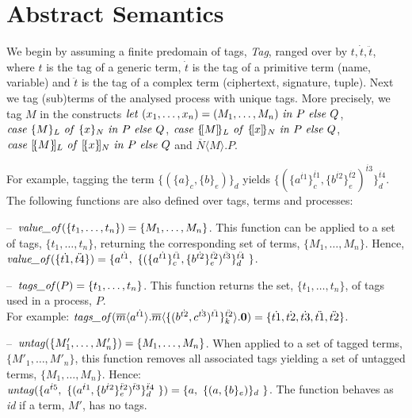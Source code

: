 \documentclass{entcs} \usepackage{entcsmacro}
\begin{document}
\section{Abstract Semantics\label{sect:abssemspi}}
We begin by assuming a finite predomain of tags, {\itshape Tag\/}, ranged over by $t, \dot{t}, \ddot{t}$, where $t$ is the tag of a generic term, $\dot{t}$ is the tag of a primitive term (name, variable) and $\ddot{t}$ is the tag of a complex term (ciphertext, signature, tuple).  Next we tag (sub)terms of the analysed process with unique tags.  More precisely, we tag $M$ in the constructs $\mbox{{\itshape let\/} }(x_1,\ldots,x_n)=(M_1,\ldots,M_n)\mbox{ {\itshape in\/} }P\mbox{ {\itshape else\/} }Q$, $\mbox{{\itshape case\/} }\{M\}_L\mbox{ {\itshape of\/} }\{x\}_N\mbox{ {\itshape in\/} }P\mbox{ {\itshape else\/} }Q$, $\mbox{{\itshape case\/} }\{\![M]\!\}_L\mbox{ {\itshape of\/} }\{\![x]\!\}_{N}\mbox{ {\itshape in\/} }P\mbox{ {\itshape else\/} }Q$,\\$\mbox{{\itshape case\/} }[\!\{M\}\!]_L\mbox{ {\itshape of\/} }[\!\{x\}\!]_{N}\mbox{ {\itshape in\/} }P\mbox{ {\itshape else\/} }Q$ and 
$\overline{N}\langle M\rangle.P$.

For example, tagging the term $\{(\{a\}_c,\{b\}_e)\}_d$ yields $\{(\{a^{\dot{t1}}\}_c^{\ddot{t1}},\{b^{\dot{t2}}\}_e^{\ddot{t2}})^{\ddot{t3}}\}_d^{\ddot{t4}}$. The following functions are also defined over tags, terms and processes:

\noindent
--~$\mbox{{\itshape value\_of\/}}(\{t_1,\ldots,t_n\})=\{M_1,\ldots,M_n\}$.  This function can be applied to a set of tags, $\{t_1,\ldots,t_n\}$, returning the corresponding set of terms, $\{M_1,\ldots,M_n\}$.  Hence, $\mbox{{\itshape value\_of\/}}(\{\dot{t1}, \ddot{t4}\})=\{a^{\dot{t1}},~\{(\{a^{\dot{t1}}\}_c^{\ddot{t1}},\{b^{\dot{t2}}\}_e^{\ddot{t2}})^{\ddot{t3}}\}_d^{\ddot{t4}}~\}$.

\noindent
--~$\mbox{{\itshape tags\_of\/}}(P)=\{t_1,\ldots,t_n\}$.  This function returns the set, $\{t_1,\ldots,t_n\}$, of tags used in a process, $P$.\\
For example: $\mbox{{\itshape tags\_of\/}}(\overline{m}\langle a^{\dot{t1}}\rangle. \overline{m}\langle\{(b^{\dot{t2}},c^{\dot{t3}})^{\ddot{t1}}\}^{\ddot{t2}}_k\rangle.{\bf 0})=\{\dot{t1},\dot{t2},\dot{t3},\ddot{t1},\ddot{t2}\}$.

\noindent
--~$\mbox{{\itshape untag\/}}(\{M'_1,\ldots,M'_n\})=\{M_1,\ldots,M_n\}$. When applied to a set of tagged terms, $\{M'_1,\ldots,M'_n\}$, this function removes all associated tags yielding a set of untagged terms, $\{M_1,\ldots,M_n\}$.  Hence:\\$\mbox{{\itshape untag\/}}(\{a^{\dot{t}5},~\{(a^{\dot{t}1},\{b^{\dot{t}2}\}_e^{\ddot{t}2})^{\ddot{t}3}\}_d^{\ddot{t}4}~\})=\{a,~\{(a,\{b\}_e)\}_d~\}$. The function behaves as {\itshape id\/} if a term, $M'$, has no tags.
\end{document}
